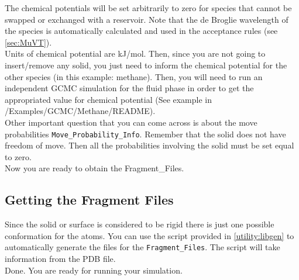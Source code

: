 The chemical potentials will be set arbitrarily to zero for species that cannot 
be swapped or exchanged with a reservoir. Note that the de Broglie wavelength of the 
species is automatically calculated and used in the acceptance rules (see \ref{sec:MuVT}). \\

Units of chemical potential are kJ/mol. Then, since you are not going to insert/remove any 
solid, you just need to inform the chemical potential for the other species 
(in this example: methane). Then, you will need to run an independent GCMC 
simulation for the fluid phase in order to get the appropriated value for chemical 
potential (See example in /Examples/GCMC/Methane/README). \\

Other important question that you can come across is about the move 
probabilities \texttt{Move\_Probability\_Info}. 
Remember that the solid does not have freedom of move. 
Then all the probabilities involving the solid must be set equal to zero. \\

Now you are ready to obtain the Fragment\_Files. \\

\subsection{Getting the Fragment Files}\label{sec:fragment file}
Since the solid or surface is considered to be rigid there is just one possible conformation 
for the atoms. You can use the script provided in \ref{utility:libgen} to
automatically generate the files for the \texttt{Fragment\_Files}.
The script will take information from the PDB file. \\


Done. You are ready for running your simulation.
